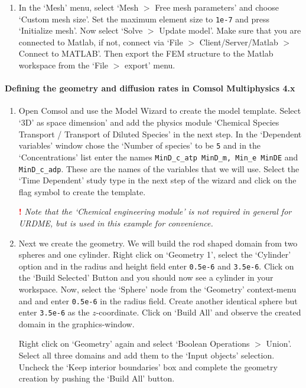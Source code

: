 \begin{enumerate}
\item In the `Mesh' menu, select `Mesh $>$ Free mesh parameters' and
  choose `Custom mesh size'.  Set the maximum element size to
  \texttt{1e-7} and press `Initialize mesh'.  Now select `Solve $>$
  Update model'.  Make sure that you are connected to Matlab, if not,
  connect via `File $>$ Client/Server/Matlab $>$ Connect to MATLAB'.
  Then export the FEM structure to the Matlab workspace from the `File
  $>$ export' menu.
\end{enumerate}

\paragraph*{Defining the geometry and diffusion rates in Comsol Multiphysics 4.x}

\begin{enumerate}
\item Open Comsol and use the Model Wizard to create the model template.
Select `3D' as space dimension' and add the physics module `Chemical Species Transport / Transport of Diluted Species' 
in the next step. In the `Dependent variables' window chose the `Number of species' to be \texttt{5}
and in the `Concentrations' list enter the names \texttt{MinD\_c\_atp MinD\_m,
  Min\_e MinDE} and  \texttt{MinD\_c\_adp}. These are the names of the variables
  that we will use.  Select the `Time Dependent' study type in the next step of the wizard and click 
  on the flag symbol to create the template.
  
    {\bf \textcolor{red}{!}} \emph{Note that the `Chemical engineering module' is not required 
    in general for URDME, but is used in this example for convenience.}

\item Next we create the geometry. We will build the rod shaped
  domain from two spheres and one cylinder. Right click on `Geometry 1', 
  select the `Cylinder' option and in the radius and height field enter \texttt{0.5e-6} and
  \texttt{3.5e-6}. Click on the `Build Selected' Button and you should now see a cylinder in
  your workspace. 
  Now, select the `Sphere' node from the `Geometry' context-menu and and enter 
  \texttt{0.5e-6} in the radius field. Create another identical sphere but enter \texttt{3.5e-6} as
  the $z$-coordinate.  Click on `Build All' and observe the created domain in the graphics-window.
  
  Right click on `Geometry' again and select `Boolean Operations $>$ Union'. Select all three
  domains and add them to the `Input objects' selection.  Uncheck the `Keep interior boundaries'
  box and complete the geometry creation by pushing the `Build All' button.


\end{enumerate}
